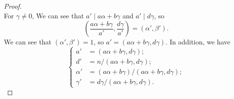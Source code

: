 \documentclass{article}
\newcommand{\Mod}[1]{\ (\mathrm{mod}\ #1)}
\begin{document}
\begin{proof}
\begin{equation*}
    \end{equation*}
    For $\gamma\neq 0$, We can see that $a'\mid a\alpha+b\gamma$ and $a' \mid d\gamma$, so \[(\frac{a\alpha+b\gamma}{a'},\frac{d\gamma}{a'})=(\alpha',\beta').\] We can see that $(\alpha',\beta')=1$, so $a'=(a\alpha+b\gamma,d\gamma)$. In addition, we have \begin{equation}\label{eqn 1}
        \begin{cases}
            a'&=(a\alpha+b\gamma,d\gamma);\\
            d'&=n/(a\alpha+b\gamma,d\gamma);\\
            \alpha'&=(a\alpha+b\gamma)/(a\alpha+b\gamma,d\gamma);\\
            \gamma'&=d\gamma/(a\alpha+b\gamma,d\gamma).
        \end{cases}
    \end{equation}

\end{proof}
\end{document}
